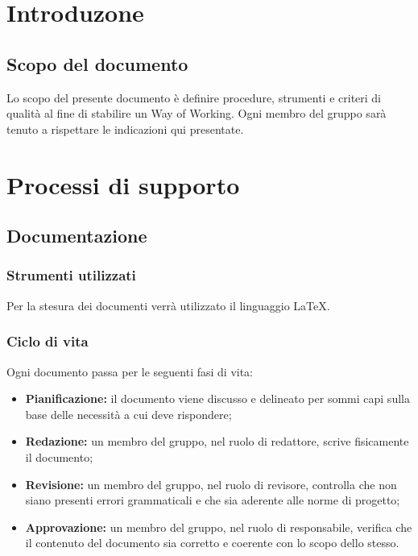\documentclass[a4paper, 12pt]{article}
\begin{document}
\makefrontpage

\makeversioni

\section{Introduzone}
\subsection{Scopo del documento}
Lo scopo del presente documento è definire procedure, strumenti e criteri di qualità al fine di stabilire un Way of Working. Ogni membro del gruppo sarà tenuto a rispettare le indicazioni qui presentate.

\section{Processi di supporto}

\subsection{Documentazione}\label{documentazione}

\subsubsection{Strumenti utilizzati}
Per la stesura dei documenti verrà utilizzato il linguaggio \LaTeX.

\subsubsection{Ciclo di vita}
Ogni documento passa per le seguenti fasi di vita:
\begin{itemize}
\item \textbf{Pianificazione:} il documento viene discusso e delineato per sommi capi sulla base delle necessità a cui deve rispondere;
\item \textbf{Redazione:} un membro del gruppo, nel ruolo di redattore, scrive fisicamente il documento;
\item \textbf{Revisione:} un membro del gruppo, nel ruolo di revisore, controlla che non siano presenti errori grammaticali e che sia aderente alle norme di progetto;
\item \textbf{Approvazione:} un membro del gruppo, nel ruolo di responsabile, verifica che il contenuto del documento sia corretto e coerente con lo scopo dello stesso.
\end{itemize}
\end{document}
